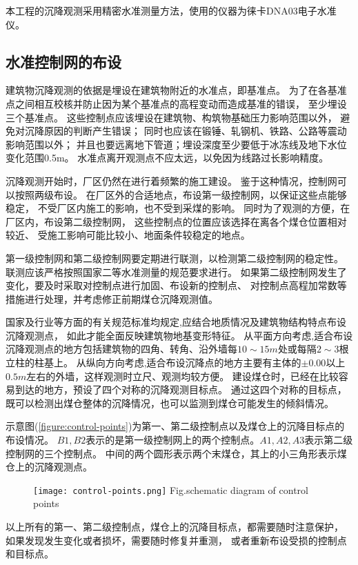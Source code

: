 本工程的沉降观测采用精密水准测量方法，使用的仪器为徕卡DNA03电子水准仪。

\subsection{水准控制网的布设}
建筑物沉降观测的依据是埋设在建筑物附近的水准点，即基准点。
为了在各基准点之间相互校核并防止因为某个基准点的高程变动而造成基准的错误，
至少埋设三个基准点。
这些控制点应该埋设在建筑物、构筑物基础压力影响范围以外，
避免对沉降原因的判断产生错误；
同时也应该在锻锤、轧钢机、铁路、公路等震动影响范围以外；
并且也要远离地下管道；埋设深度至少要低于冰冻线及地下水位变化范围0.5m。
水准点离开观测点不应太远，以免因为线路过长影响精度。

沉降观测开始时，厂区仍然在进行着频繁的施工建设。
鉴于这种情况，控制网可以按照两级布设。
在厂区外的合适地点，布设第一级控制网，以保证这些点能够稳定，
不受厂区内施工的影响，也不受到采煤的影响。
同时为了观测的方便，在厂区内，布设第二级控制网，
这些控制点的位置应该选择在离各个煤仓位置相对较近、
受施工影响可能比较小、地面条件较稳定的地点。

第一级控制网和第二级控制网要定期进行联测，以检测第二级控制网的稳定性。
联测应该严格按照国家二等水准测量的规范要求进行。
如果第二级控制网发生了变化，要及时采取对控制点进行加固、布设新的控制点、
对控制点高程加常数等措施进行处理，并考虑修正前期煤仓沉降观测值。

国家及行业等方面的有关规范标准均规定,应结合地质情况及建筑物结构特点布设沉降观测点，
如此才能全面反映建筑物地基变形特征。
从平面方向考虑,适合布设沉降观测点的地方包括建筑物的四角、转角、沿外墙每$10\sim15m$处或每隔$2\sim3$根立柱的柱基上。
从纵向方向考虑,适合布设沉降点的地方主要有主体的$± 0.00$以上$0.5m$左右的外墙，这样观测时立尺、观测均较方便。
建设煤仓时，已经在比较容易到达的地方，预设了四个对称的沉降观测目标点。
通过这四个对称的目标点，既可以检测出煤仓整体的沉降情况，也可以监测到煤仓可能发生的倾斜情况。

示意图(\ref{figure:control-points})为第一、第二级控制点以及煤仓上的沉降目标点的布设情况。
$B1, B2$表示的是第一级控制网上的两个控制点。$A1, A2, A3$表示第二级控制网的三个控制点。
中间的两个圆形表示两个末煤仓，其上的小三角形表示煤仓上的沉降观测点。
\begin{figure}[!htbp]
   \centering
   \texttt{[image: control-points.png]}
			{Fig.}{schematic diagram of control points}
\end{figure}

以上所有的第一、第二级控制点，煤仓上的沉降目标点，都需要随时注意保护，
如果发现发生变化或者损坏，需要随时修复并重测，
或者重新布设受损的控制点和目标点。

